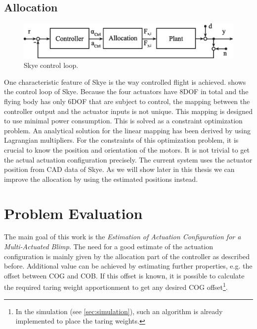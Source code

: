 \subsection{Allocation}

\begin{figure}[hbtp]
\centering
\includegraphics[width=.9\linewidth]{images/intro/system_loop_3.eps}
\caption{Skye control loop.}
\label{fig:system_loop_3}
\end{figure}

One characteristic feature of Skye is the way controlled flight is achieved. 
 shows the control loop of Skye.
Because the four actuators have 8DOF in total and the flying body has only 6DOF that are subject to control,
the mapping between the controller output and the actuator inputs is not unique.
This mapping is designed to use minimal power consumption.
This is solved as a constraint optimization problem.
An analytical solution for the linear mapping has been derived by \citet{Schaffner2012} using Lagrangian multipliers.
For the constraints of this optimization problem, it is crucial to know the position and orientation of the motors.
It is not trivial to get the actual actuation configuration precisely.
The current system uses the actuator position from CAD data of Skye. 
As we will show later in this thesis we can improve the allocation by using the estimated positions instead.


\section{Problem Evaluation}
\label{sec:problem_evaluation}
The main goal of this work is the \textit{Estimation of Actuation Configuration for a Multi-Actuated Blimp}.
The need for a good estimate of the actuation configuration is mainly given by the allocation part of the controller as described before.
Additional value can be achieved by estimating further properties, e.g. the offset between COG and COB.
If this offset is known, it is possible to calculate the required taring weight apportionment to get any desired COG offset\footnote{
In the simulation (see \cref{sec:simulation}), such an algorithm is already implemented to place the taring weights.
}.

